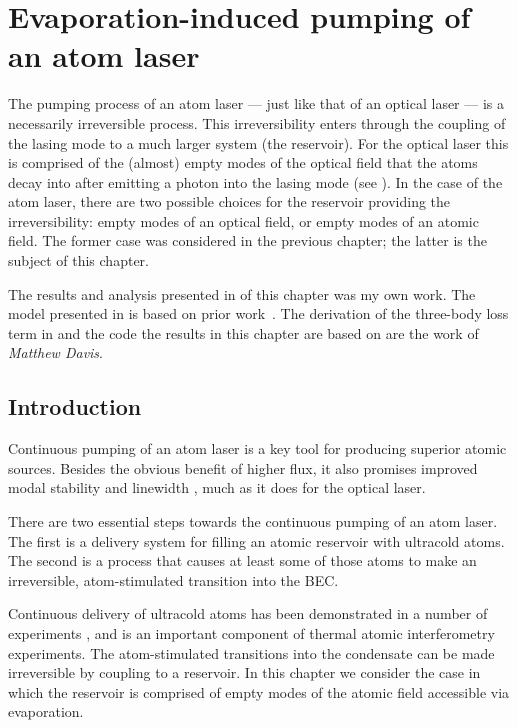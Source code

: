 \chapter{Evaporation-induced pumping of an atom laser}
\label{KineticTheory}
\graphicspath{{Figures/KineticTheory/}{Figures/Common/}}

The pumping process of an atom laser --- just like that of an optical laser --- is a necessarily irreversible process. This irreversibility enters through the coupling of the lasing mode to a much larger system (the reservoir).  For the optical laser this is comprised of the (almost) empty modes of the optical field that the atoms decay into after emitting a photon into the lasing mode (see ).  In the case of the atom laser, there are two possible choices for the reservoir providing the irreversibility: empty modes of an optical field, or empty modes of an atomic field.  The former case was considered in the previous chapter; the latter is the subject of this chapter. 

The results and analysis presented in  of this chapter was my own work.  The model presented in  is based on prior work~\citep{Davis:2000vn,Bijlsma:2000}.  The derivation of the three-body loss term in  and the code the results in this chapter are based on are the work of \emph{Matthew Davis}.

\section{Introduction}

Continuous pumping of an atom laser is a key tool for producing superior atomic sources. Besides the obvious benefit of higher flux, it also promises improved modal stability \citep{Haine:2002kp,Haine:2003fs} and linewidth \citep{Johnsson:2007}, much as it does for the optical laser.

There are two essential steps towards the continuous pumping of an atom laser. The first is a delivery system for filling an atomic reservoir with ultracold atoms. The second is a process that causes at least some of those atoms to make an irreversible, atom-stimulated transition into the BEC.

Continuous delivery of ultracold atoms has been demonstrated in a number of experiments \citep{Schmid:2006,Lahaye:2004,Greiner:2001,Greiner:2007,Streed:2006,Muller:2007}, and is an important component of thermal atomic interferometry experiments.  The atom-stimulated transitions into the condensate can be made irreversible by coupling to a reservoir. In this chapter we consider the case in which the reservoir is comprised of empty modes of the atomic field accessible via evaporation.

